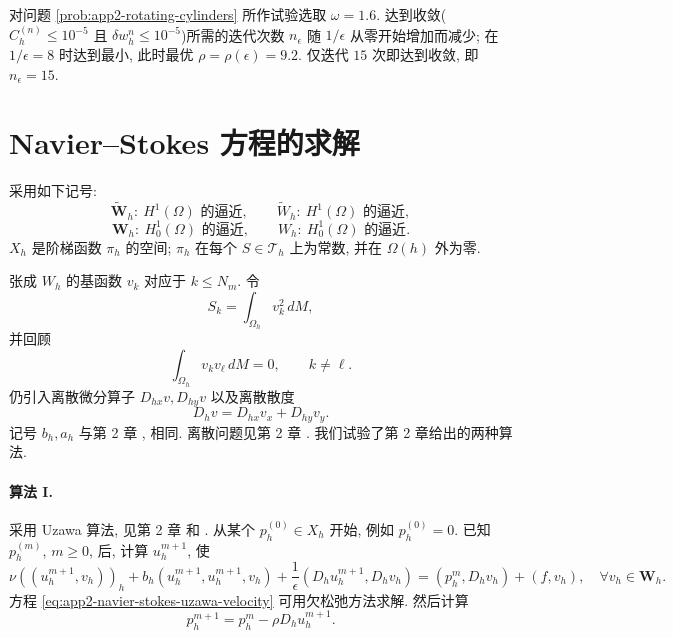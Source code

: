 对问题 \ref{prob:app2-rotating-cylinders} 所作试验选取 $\omega=1.6$. 达到收敛($C_h^{(n)}\leq10^{-5}$ 且 $\delta w_h^n\leq10^{-5}$)所需的迭代次数 $n_\epsilon$ 随 $1/\epsilon$ 从零开始增加而减少; 在 $1/\epsilon=8$ 时达到最小, 此时最优 $\rho=\rho(\epsilon)=9.2$. 仅迭代 $15$ 次即达到收敛, 即 $n_\epsilon=15$.

\section{Navier--Stokes 方程的求解}
\label{sec:app2-navier-stokes-solution}

采用如下记号:
\[
\widetilde{\mathbf W}_h:\ H^1(\Omega)\text{ 的逼近},
\qquad
\widetilde W_h:\ H^1(\Omega)\text{ 的逼近},
\]
\[
\mathbf W_h:\ H_0^1(\Omega)\text{ 的逼近},
\qquad
W_h:\ H_0^1(\Omega)\text{ 的逼近}.
\]
$X_h$ 是阶梯函数 $\pi_h$ 的空间; $\pi_h$ 在每个 $S\in\mathcal T_h$ 上为常数, 并在 $\Omega(h)$ 外为零.

\hypertarget{appendix-02-page-349}{}
张成 $W_h$ 的基函数 $v_k$ 对应于 $k\leq N_m$. 令
\[
S_k=\int_{\Omega_h}v_k^2\,dM,
\]
并回顾
\[
\int_{\Omega_h}v_kv_\ell\,dM=0,
\qquad k\neq\ell.
\]
仍引入离散微分算子 $D_{hx}v,D_{hy}v$ 以及离散散度
\[
D_hv=D_{hx}v_x+D_{hy}v_y.
\]
记号 $b_h,a_h$ 与第 2 章 
, 
 相同. 离散问题见第 2 章 
. 我们试验了第 2 章给出的两种算法.

\paragraph{算法 I.}
采用 Uzawa 算法, 见第 2 章 
 和 
. 从某个 $p_h^{(0)}\in X_h$ 开始, 例如 $p_h^{(0)}=0$. 已知 $p_h^{(m)}$, $m\geq0$, 后, 计算 $u_h^{m+1}$, 使
\begin{equation}
\nu((u_h^{m+1},v_h))_h
+b_h(u_h^{m+1},u_h^{m+1},v_h)
+\frac1\epsilon(D_hu_h^{m+1},D_hv_h)
=(p_h^m,D_hv_h)+(f,v_h),
\quad\forall v_h\in\mathbf W_h.
\label{eq:app2-navier-stokes-uzawa-velocity}
\end{equation}
方程 \eqref{eq:app2-navier-stokes-uzawa-velocity} 可用欠松弛方法求解. 然后计算
\begin{equation}
p_h^{m+1}=p_h^m-\rho D_hu_h^{m+1}.
\label{eq:app2-navier-stokes-uzawa-pressure}
\end{equation}

